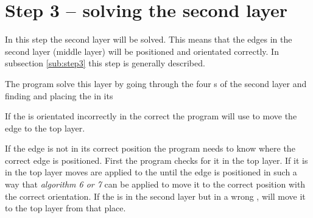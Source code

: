 \section{Step 3 -- solving the second layer}
In this step the second layer will be solved. 
This means that the edges in the second layer (middle layer) will be positioned and orientated correctly. 
In subsection \ref{sub:step3} this step is generally described. 

The program solve this layer by going through the four \cubicle{}s of the second layer and finding and placing the \cpiece{} in its \cubicle{}

If the \cpiece is orientated incorrectly in the correct \cubicle{} the program will use   to move the edge \cpiece{} to the top layer.

If the edge \cpiece{} is not in its correct position the program needs to know where the correct edge \cpiece{} is positioned. First the program checks for it in the top layer. 
If it is in the top layer  moves are applied to the \rubik{} until the edge \cpiece{} is positioned in such a way that \textit{algorithm 6 or 7} can be applied to move it to the correct position with the correct orientation. 
If the \cpiece{} is in the second layer but in a wrong \cubicle{},  will move it to the top layer from that place. 